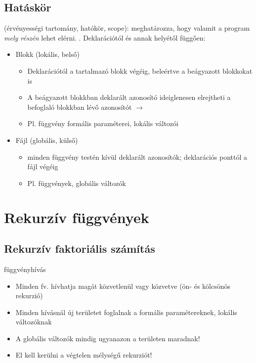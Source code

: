 \documentclass[usenames,dvipsnames,aspectratio=169]{beamer}
\begin{document}
\subsection{Hatáskör}
\begin{frame}
   (érvényességi tartomány, hatókör, scope): meghatározza, hogy valamit a program \emph{mely részén} 
  lehet elérni. . Deklarációtól és annak helyétől függően:
  \begin{itemize}
    \item Blokk (lokális, belső)
    \begin{itemize}
      \item Deklarációtól a tartalmazó blokk végéig, beleértve a beágyazott blokkokat is
      \item A beágyazott blokkban deklarált azonosító ideiglenesen elrejtheti 
      a befoglaló blokkban lévő azonosítót $\to$ 
      \item Pl. függvény formális paraméterei, lokális változói
    \end{itemize}
    \item Fájl (globális, külső)
    \begin{itemize}
      \item minden függvény testén kívül deklarált azonosítók; deklarációs ponttól a fájl végéig
      \item Pl. függvények, globális változók
    \end{itemize}
  \end{itemize}
\end{frame}

\section{Rekurzív függvények}
\subsection{Rekurzív faktoriális számítás}
\begin{frame}
   függvényhívás
  \begin{itemize}
    \item Minden fv. hívhatja magát közvetlenül vagy közvetve (ön- és kölcsönös rekurzió)
    \item Minden hívásnál új területet foglalnak a formális paramétereknek, lokális változóknak
    \item A globális változók mindig ugyanazon a területen maradnak!
    \item El kell kerülni a végtelen mélységű rekurziót!
  \end{itemize}
  \begin{exampleblock}{}
    
  \end{exampleblock}
\end{frame}
\end{document}
